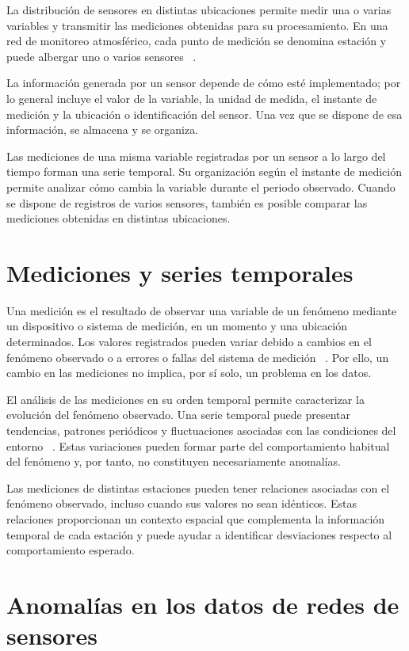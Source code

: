 La distribución de sensores en distintas ubicaciones permite medir una o varias variables y transmitir las mediciones obtenidas para su procesamiento. En una red de monitoreo atmosférico, cada punto de medición se denomina estación y puede albergar uno o varios sensores ~\cite{akyildiz2002wsn}.

La información generada por un sensor depende de cómo esté implementado; por lo general incluye el valor de la variable, la unidad de medida, el instante de medición y la ubicación o identificación del sensor. Una vez que se dispone de esa información, se almacena y se organiza.

Las mediciones de una misma variable registradas por un sensor a lo largo del tiempo forman una serie temporal. Su organización según el instante de medición permite analizar cómo cambia la variable durante el periodo observado. Cuando se dispone de registros de varios sensores, también es posible comparar las mediciones obtenidas en distintas ubicaciones.

\section{Mediciones y series temporales}
\label{subsec:medicioines-serie-temporal}

Una medición es el resultado de observar una variable de un fenómeno mediante un dispositivo o sistema de medición, en un momento y una ubicación determinados. Los valores registrados pueden variar debido a cambios en el fenómeno observado o a errores o fallas del sistema de medición ~\cite{teh2020sensor}. Por ello, un cambio en las mediciones no implica, por sí solo, un problema en los datos.

El análisis de las mediciones en su orden temporal permite caracterizar la evolución del fenómeno observado. Una serie temporal puede presentar tendencias, patrones periódicos y fluctuaciones asociadas con las condiciones del entorno ~\cite{hyndman2021fpp3}. Estas variaciones pueden formar parte del comportamiento habitual del fenómeno y, por tanto, no constituyen necesariamente anomalías.

Las mediciones de distintas estaciones pueden tener relaciones asociadas con el fenómeno observado, incluso cuando sus valores no sean idénticos. Estas relaciones proporcionan un contexto espacial que complementa la información temporal de cada estación y puede ayudar a identificar desviaciones respecto al comportamiento esperado.

\section{Anomalías en los datos de redes de sensores}
\label{sec:Anomalías-datos-redes-sensores}

